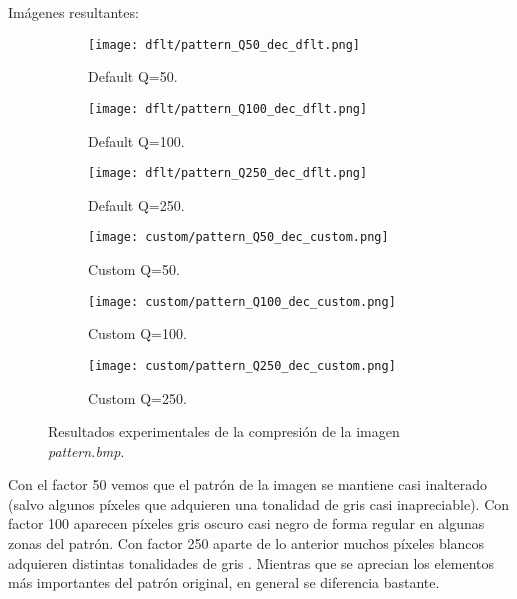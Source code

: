 \documentclass[12pt,a4paper]{article}
\begin{document}
Imágenes resultantes:
\begin{figure}[H]

    \begin{subfigure}{0.30\textwidth}
        \centering
        \texttt{[image: dflt/pattern\_Q50\_dec\_dflt.png]}
        \caption{Default Q=50.}
        
    \end{subfigure}
    \hfill
    \begin{subfigure}{0.30\textwidth}
        \centering
        \texttt{[image: dflt/pattern\_Q100\_dec\_dflt.png]}
        \caption{Default Q=100.}
        
    \end{subfigure}
    \hfill
    \begin{subfigure}{0.30\textwidth}
        \centering
        \texttt{[image: dflt/pattern\_Q250\_dec\_dflt.png]}
        \caption{Default Q=250.}
        
    \end{subfigure}
    
    \vspace{0.5cm}
    
    \begin{subfigure}{0.30\textwidth}
        \centering
        \texttt{[image: custom/pattern\_Q50\_dec\_custom.png]}
        \caption{Custom Q=50.}
        
    \end{subfigure}
    \hfill
    \begin{subfigure}{0.30\textwidth}
        \centering
        \texttt{[image: custom/pattern\_Q100\_dec\_custom.png]}
        \caption{Custom Q=100.}
        
    \end{subfigure}
    \hfill
    \begin{subfigure}{0.30\textwidth}
        \centering
        \texttt{[image: custom/pattern\_Q250\_dec\_custom.png]}
        \caption{Custom Q=250.}
        
    \end{subfigure}
    
    \caption[Resultados experimentales - pattern]{Resultados experimentales de la compresión de la imagen \textit{pattern.bmp}.}
    
\end{figure}

Con el factor 50 vemos que el patrón de la imagen se mantiene casi inalterado (salvo algunos píxeles que adquieren una tonalidad de gris casi inapreciable). Con factor 100 aparecen píxeles gris oscuro casi negro de forma regular en algunas zonas del patrón. Con factor 250 aparte de lo anterior muchos píxeles blancos adquieren distintas tonalidades de gris . Mientras que se aprecian los elementos más importantes del patrón original, en general se diferencia bastante.\\
\end{document}

